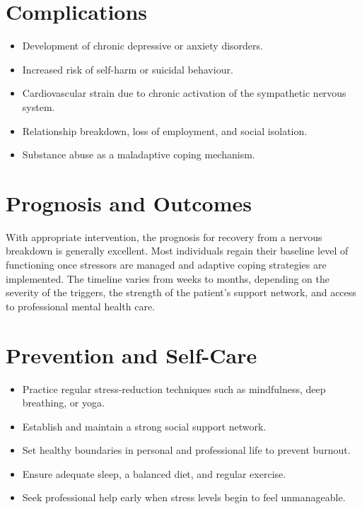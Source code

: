 \section*{Complications}
\begin{itemize}
    \item Development of chronic depressive or anxiety disorders.
    \item Increased risk of self-harm or suicidal behaviour.
    \item Cardiovascular strain due to chronic activation of the sympathetic nervous system.
    \item Relationship breakdown, loss of employment, and social isolation.
    \item Substance abuse as a maladaptive coping mechanism.
\end{itemize}

\section*{Prognosis and Outcomes}
With appropriate intervention, the prognosis for recovery from a nervous breakdown is generally excellent. Most individuals regain their baseline level of functioning once stressors are managed and adaptive coping strategies are implemented. The timeline varies from weeks to months, depending on the severity of the triggers, the strength of the patient's support network, and access to professional mental health care.

\section*{Prevention and Self-Care}
\begin{itemize}
    \item Practice regular stress-reduction techniques such as mindfulness, deep breathing, or yoga.
    \item Establish and maintain a strong social support network.
    \item Set healthy boundaries in personal and professional life to prevent burnout.
    \item Ensure adequate sleep, a balanced diet, and regular exercise.
    \item Seek professional help early when stress levels begin to feel unmanageable.
\end{itemize}

